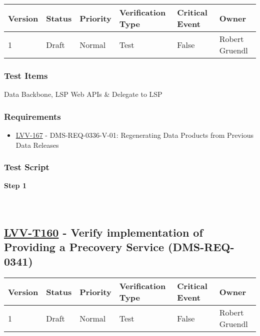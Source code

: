 \begin{longtable}[]{@{}llllll@{}}
\toprule
Version & Status & Priority & Verification Type & Critical Event &
Owner\tabularnewline
\midrule
\endhead
1 & Draft & Normal & Test & False & Robert Gruendl\tabularnewline
\bottomrule
\end{longtable}

\hypertarget{test-items-135}{%
\subsubsection{Test Items}\label{test-items-135}}

Data Backbone, LSP Web APIs \& Delegate to LSP

\hypertarget{requirements-136}{%
\subsubsection{Requirements}\label{requirements-136}}

\begin{itemize}
\tightlist
\item
  \href{https://jira.lsstcorp.org/browse/LVV-167}{LVV-167} -
  DMS-REQ-0336-V-01: Regenerating Data Products from Previous Data
  Releases
\end{itemize}

\hypertarget{test-script-136}{%
\subsubsection{Test Script}\label{test-script-136}}

\textbf{Step 1}\\
~\\
~\\

\hypertarget{lvv-t160---verify-implementation-of-providing-a-precovery-service-dms-req-0341}{%
\subsection{\texorpdfstring{\href{https://jira.lsstcorp.org/secure/Tests.jspa\#/testCase/LVV-T160}{LVV-T160}
- Verify implementation of Providing a Precovery Service
(DMS-REQ-0341)}{LVV-T160 - Verify implementation of Providing a Precovery Service (DMS-REQ-0341)}}\label{lvv-t160---verify-implementation-of-providing-a-precovery-service-dms-req-0341}}

\begin{longtable}[]{@{}llllll@{}}
\toprule
Version & Status & Priority & Verification Type & Critical Event &
Owner\tabularnewline
\midrule
\endhead
1 & Draft & Normal & Test & False & Robert Gruendl\tabularnewline
\bottomrule
\end{longtable}

